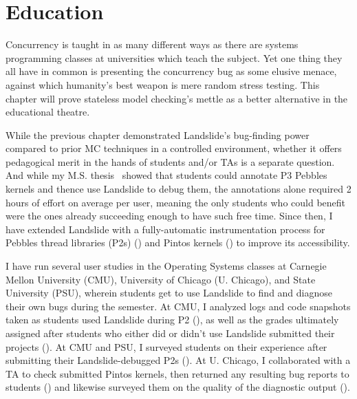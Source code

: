 \chapter{Education}
\label{chap:education}


Concurrency is taught in as many different ways as there are
systems programming classes at universities which teach the subject.
Yet one thing they all have in common is presenting the concurrency bug
as some elusive menace,
against which humanity's best weapon is mere random stress testing.
This chapter will prove stateless model checking's mettle as a better alternative in the educational theatre.

While the previous chapter demonstrated Landslide's bug-finding power
compared to prior MC techniques in a controlled environment,
whether it offers pedagogical merit in the hands of students and/or TAs is a separate question.
And while my M.S. thesis~\cite{landslide} showed that students
could annotate P3 Pebbles kernels and thence use Landslide to debug them,
the annotations alone required 2 hours of effort on average per user,
meaning the only students who could benefit were the ones already succeeding enough to have such free time.
Since then, I have extended Landslide with a fully-automatic instrumentation process
for Pebbles thread libraries (P2s) (\sect{\ref{sec:education-pebbles-instrumentation}})
and Pintos kernels (\sect{\ref{sec:education-pintos-instrumentation}})
to improve its accessibility.

I have run several user studies in the Operating Systems classes
at Carnegie Mellon University (CMU), University of Chicago (U. Chicago),
and  State University (PSU),
wherein students get to use Landslide to find and diagnose their own bugs during the semester.
At CMU, I analyzed logs and code snapshots taken as students used Landslide during P2
(\sect{\ref{sec:education-eval-bugfinding}}),
as well as the grades ultimately assigned after students who either did or didn't use Landslide submitted their projects
(\sect{\ref{sec:education-eval-grades}}).
At CMU and PSU, I surveyed students on their experience after submitting their Landslide-debugged P2s
(\sect{\ref{sec:education-eval-survey}}).
At U. Chicago, I collaborated with a TA to check submitted Pintos kernels,
then  returned any resulting bug reports to students
(\sect{\ref{sec:education-eval-bugfinding}})
and likewise surveyed them on the quality of the diagnostic output
(\sect{\ref{sec:education-eval-survey}}).

